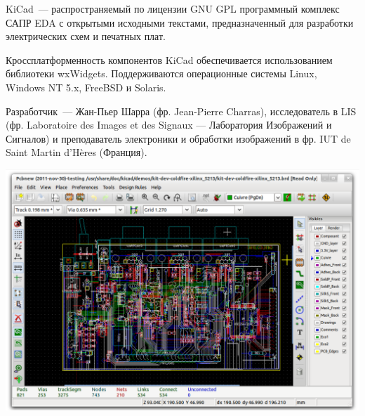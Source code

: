 

KiCad\ --- распространяемый по лицензии GNU GPL программный комплекс САПР EDA с
открытыми исходными текстами, предназначенный для разработки электрических схем
и печатных плат.

Кроссплатформенность компонентов KiCad обеспечивается использованием 
библиотеки wxWidgets. Поддерживаются операционные системы Linux, 
Windows NT 5.x, Free\-BSD и Solaris.

Разработчик\ --- Жан-Пьер Шарра (фр. Jean-Pierre Charras), исследователь 
в LIS (фр. Laboratoire des Images et des Signaux — Лаборатория Изображений 
и Сигналов) и преподаватель электроники и обработки изображений в фр. 
IUT de Saint Martin d’Hères (Франция).

\bigskip\includegraphics[height=0.5\textheight]{kicad/kicad_pcbnew.png}

